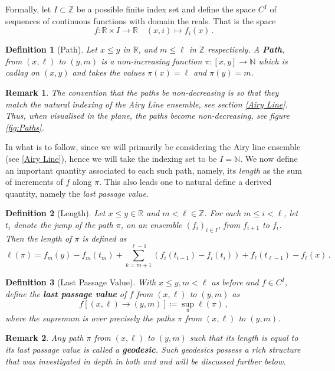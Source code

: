 \documentclass[12pt]{report}
\theoremstyle{plain}
\newtheorem*{remark}{Remark}
\newtheorem{definition}{Definition}[section]
\begin{document}
Formally, let \(I\subset \mathbb{Z}\) be a possible finite index set and define the space \(C^{I}\) of sequences of continuous functions with domain the reals. That is the space
\[f: \mathbb{R}\times I\to \mathbb{R}\quad (x,i)\mapsto f_i(x)\,.\]

\begin{definition}[Path] Let \(x\leq y\) in \(\mathbb{R}\), and \(m\leq \ell\) in \(\mathbb{Z}\) respectively. A \textbf{Path}, from \((x,\ell)\) to \((y,m)\) is a non-increasing function \(\pi: [x,y] \to \mathbb{N}\) which is cadlag on \((x,y)\) and takes the values \(\pi(x)= \ell\) and \(\pi(y)= m\).
\end{definition}%

\begin{remark}
    The convention that the paths be non-decreasing is so that they match the natural indexing of the Airy Line ensemble, see section \ref{Airy Line}. Thus, when visualised in the plane, the paths become non-decreasing, see figure \ref{fig:Paths}.
\end{remark}

In what is to follow, since we will primarily be considering the Airy line ensemble (see \ref{Airy Line}), hence we will take the indexing set to be \(I = \mathbb{N}\). We now define an important quantity associated to each such path, namely, its \textit{length} as the sum of increments of \(f\) along \(\pi\). This also leads one to natural define a derived quantity, namely the \textit{last passage value}.

\begin{definition}[Length] Let \(x\leq y \in \mathbb{R}\) and \(m < \ell\in\mathbb{Z}\). For each \(m\leq i <\ell\), let \(t_i\) denote the jump of the path \(\pi\), on an ensemble \((f_i)_{i\in I}\), from \(f_{i+1}\) to \(f_i\). Then the length of \(\pi\) is defined as 
\[
\ell(\pi) = f_m(y)-f_m(t_m) + \displaystyle\sum_{k = m+1}^{\ell-1}(f_i(t_{i-1})-f_i(t_i))+f_{\ell}(t_{\ell-1})-f_{\ell}(x)\,.
\]
\end{definition}%

\begin{definition}[Last Passage Value]\label{Definition: last passage}
    With \(x\leq y, m<\ell\) as before and \(f\in C^{I}\), define the \textbf{last passage value} of \(f\) from \((x,\ell)\) to \((y,m)\) as
    \[
    f[(x,\ell)\to(y,m)] \coloneqq \displaystyle \sup_{\pi}\ell(\pi)\,,
    \]
where the supremum is over precisely the paths \(\pi\) from \((x,\ell)\) to \((y,m)\).
\end{definition}%
\begin{remark}
    Any path \(\pi\) from \((x,\ell)\) to \((y,m)\) such that its length is equal to its last passage value is called a \textbf{geodesic}. Such geodesics possess a rich structure that was investigated in depth in both \cite{DOV} and \cite{sarkar2021brownian} and will be discussed further below.
\end{remark}
\end{document}
